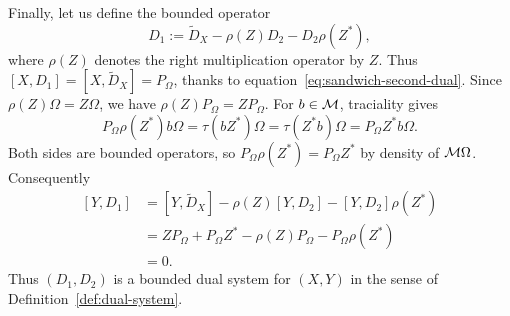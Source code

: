 \begin{example}
Finally, let us define the bounded operator
\[
 D_1:=\tilde{D}_X-\rho(Z)D_2-D_2\rho(Z^*),
\]
where $\rho(Z)$ denotes the right multiplication operator by $Z$.
Thus $[X,D_1]=[X,\tilde{D}_X]=P_\Omega$, thanks to equation~\eqref{eq:sandwich-second-dual}.
Since $\rho(Z)\Omega=Z\Omega$, we have $\rho(Z)P_\Omega=ZP_\Omega$.
For $b\in\mathcal M$, traciality gives
\[
 P_\Omega\rho(Z^*)b\Omega
 =\tau(bZ^*)\Omega
 =\tau(Z^*b)\Omega
 =P_\Omega Z^*b\Omega.
\]
Both sides are bounded operators, so $P_\Omega\rho(Z^*)=P_\Omega Z^*$ by density of $\mathcal M\Omega$.
Consequently
\[
 \begin{aligned}
 [Y,D_1]
 &=[Y,\tilde{D}_X]-\rho(Z)[Y,D_2]-[Y,D_2]\rho(Z^*)\\
 &=ZP_\Omega+P_\Omega Z^*-\rho(Z)P_\Omega-P_\Omega\rho(Z^*)\\
 &=0.
 \end{aligned}
\]
Thus $(D_1,D_2)$ is a bounded dual system for $(X,Y)$ in the sense of Definition~\ref{def:dual-system}.
\end{example}

